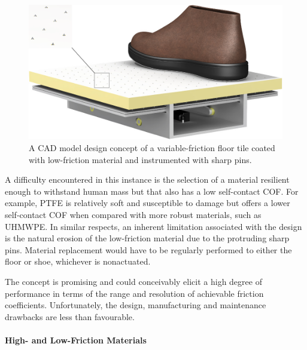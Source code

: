 \documentclass [12pt,letterpaper]{report}
\begin{document}
\begin{figure}%
  \centering
  \includegraphics{fig/VFFD_pins}%
  \caption{A CAD model design concept of a variable-friction floor tile coated with low-friction material and instrumented with sharp pins.%
  }
  \label{VFFD_pins}
\end{figure}


A difficulty encountered in this instance is the selection of a material resilient enough to withstand human mass but that also has a low self-contact COF. For example, PTFE is relatively soft and susceptible to damage but offers a lower self-contact COF when compared with more robust materials, such as UHMWPE. In similar respects, an inherent limitation associated with the design is the natural erosion of the low-friction material due to the protruding sharp pins. Material replacement would have to be regularly performed to either the floor or shoe, whichever is nonactuated.

The concept is promising and could conceivably elicit a high degree of performance in terms of the range and resolution of achievable friction coefficients. Unfortunately, the design, manufacturing and maintenance drawbacks are less than favourable.


\paragraph{High- and Low-Friction Materials}
\label{hlfmats}
\end{document}
